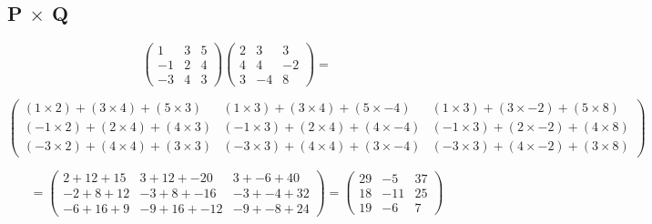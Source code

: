 \documentclass[a4paper,12pt]{article}
\begin{document}
    \subsection{P $\times$ Q}
      \begin{equation}
        \begin{pmatrix}
          1 & 3 & 5\\
          -1 & 2 & 4\\
          -3 & 4 & 3
        \end{pmatrix}
        \begin{pmatrix}
          2 & 3 & 3\\
          4 & 4 & -2\\
          3 & -4 & 8
        \end{pmatrix}
        =
      \end{equation}
      \begin{footnodesize}
        \begin{equation}
          \begin{pmatrix}
            ( 1 \times 2) + (3 \times 4) + (5 \times 3) & ( 1 \times 3) + (3 \times 4) + (5 \times -4) & ( 1 \times 3) + (3 \times -2) + (5 \times 8)\\
            (-1 \times 2) + (2 \times 4) + (4 \times 3) & (-1 \times 3) + (2 \times 4) + (4 \times -4) & (-1 \times 3) + (2 \times -2) + (4 \times 8)\\
            (-3 \times 2) + (4 \times 4) + (3 \times 3) & (-3 \times 3) + (4 \times 4) + (3 \times -4) & (-3 \times 3) + (4 \times -2) + (3 \times 8)
          \end{pmatrix}
        \end{equation}
      \end{footnodesize}
      \begin{equation}
        =
        \begin{pmatrix}
          2 + 12 + 15 & 3 + 12 + -20 & 3 + -6 + 40\\
          -2 + 8 + 12 & -3 + 8 + -16 & -3 + -4 + 32\\
          -6 + 16 + 9 & -9 + 16 + -12 & -9 + -8 + 24
        \end{pmatrix}
        =
        \begin{pmatrix}
          29 & -5 & 37\\
          18 & -11 & 25\\
          19 & -6 & 7
        \end{pmatrix}
      \end{equation}
\end{document}
